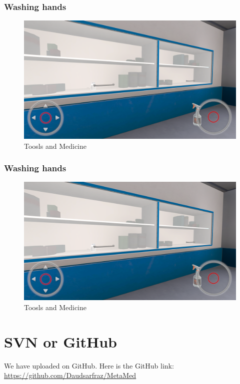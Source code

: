 \subsubsection{Washing hands}
\begin{figure}[h]
	\centering
	\includegraphics[width=0.65\linewidth]{Images/Toosls and Medicine.png}
	\caption{Toosls and Medicine}
	\label{fig:system-diagram}
\end{figure}

\subsubsection{Washing hands}
\begin{figure}[h]
	\centering
	\includegraphics[width=0.65\linewidth]{Images/Toosls and Medicine.png}
	\caption{Toosls and Medicine}
	\label{fig:system-diagram}
\end{figure}

\section{SVN or GitHub}
We have uploaded on GitHub. Here is the GitHub link: \\
\href{https://github.com/Daudsarfraz/MetaMed}{https://github.com/Daudsarfraz/MetaMed}
